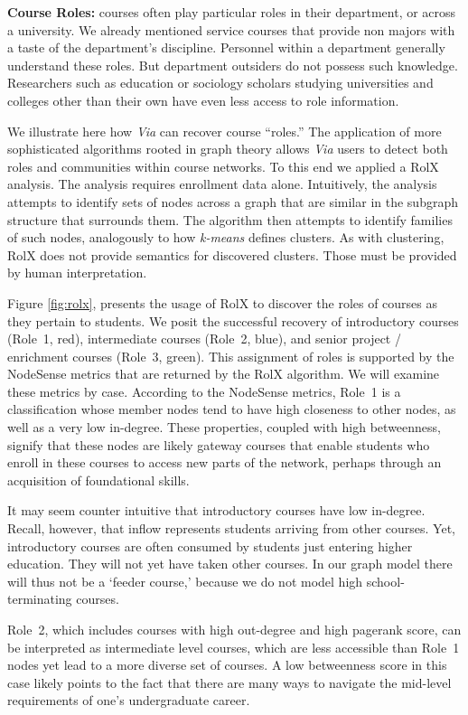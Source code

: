 \documentclass{sigchi}
\begin{document}
{\bf Course Roles:} courses often play particular roles in their
department, or across a university. We already mentioned service
courses that provide non majors with a taste of the department's
discipline. Personnel within a department generally understand these
roles. But department outsiders do not possess such
knowledge. Researchers such as education or sociology scholars
studying universities and colleges other than their own have even less
access to role information.

We illustrate here how {\em Via} can recover course ``roles.'' The
application of more sophisticated algorithms rooted in graph theory
allows {\em Via} users to detect both roles and communities within
course networks. To this end we applied a RolX \cite{Henderson2012}
analysis. The analysis requires enrollment data alone. Intuitively,
the analysis attempts to identify sets of nodes across a graph that
are similar in the subgraph structure that surrounds them. The
algorithm then attempts to identify families of such nodes,
analogously to how {\em k-means} defines clusters. As with clustering,
RolX does not provide semantics for discovered clusters. Those must be
provided by human interpretation.

Figure \ref{fig:rolx}, presents the usage of RolX to discover the
roles of courses as they pertain to students. We posit the successful
recovery of introductory courses (Role~1, red), intermediate courses
(Role~2, blue), and senior project / enrichment courses (Role~3,
green). This assignment of roles is supported by the NodeSense metrics
that are returned by the RolX algorithm. We will examine these
metrics by case. According to the NodeSense metrics, Role~1 is a
classification whose member nodes tend to have high closeness to other
nodes, as well as a very low in-degree. These properties, coupled with
high betweenness, signify that these nodes are likely gateway courses
that enable students who enroll in these courses to access new parts
of the network, perhaps through an acquisition of foundational
skills.

It may seem counter intuitive that introductory courses have low in-degree. Recall, however, that inflow represents students arriving from
other courses. Yet, introductory courses are often consumed by
students just entering higher education. They will not yet have taken
other courses. In our graph model there will thus not be a `feeder
course,' because we do not model high school-terminating courses.

Role~2, which includes courses with high out-degree and high pagerank score, can be interpreted as intermediate level courses, which are less accessible than Role~1 nodes yet lead to a more diverse set of courses. A low betweenness score in this case likely points to the fact that there are many ways to navigate the mid-level requirements of one's undergraduate career. 
\end{document}
